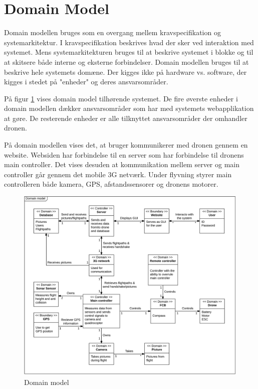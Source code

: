 \section{Domain Model}

Domain modellen bruges som en overgang mellem kravspecifikation og systemarkitektur. 
I kravspecifikation beskrives hvad der sker ved interaktion med systemet. Mens systemarkitekturen bruges til at beskrive systemet i blokke og til at skitsere både interne og eksterne forbindelser. Domain modellen bruges til at beskrive hele systemets domæne. Der kigges ikke på hardware vs. software, der kigges i stedet på "enheder" og deres ansvarsområder.

På figur \ref{fig:domain_model} vises domain model tilhørende systemet. De fire øverste enheder i domain modellen dækker ansvarsområder som har med systemets webapplikation at gøre. De resterende enheder er alle tilknyttet ansvarsområder der omhandler dronen.

På domain modellen vises det, at bruger kommunikerer med dronen gennem en website. Websiden har forbindelse til en server som har forbindelse til dronens main controller. Det vises desuden at kommunikation mellem server og main controller går gennem det mobile 3G netværk. Under flyvning styrer main controlleren både kamera, GPS, afstandssensorer og dronens motorer. 

\vspace{-5pt}
\begin{figure}[H]
	\centering
	\includegraphics[width=1.\textwidth]{Billeder/domain_model.png}
	\caption{Domain model}
	\label{fig:domain_model}
\end{figure}

